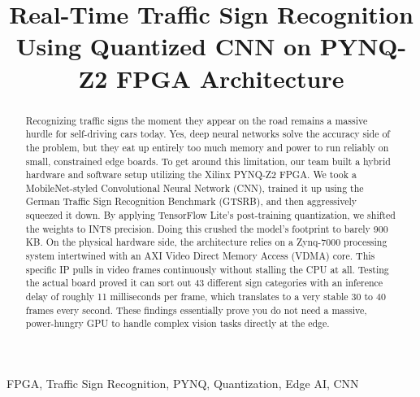 \documentclass[conference]{IEEEtran}
\begin{document}
\title{Real-Time Traffic Sign Recognition Using Quantized CNN on PYNQ-Z2 FPGA Architecture}

\author{
\and
{}
}

\maketitle

\begin{abstract}
Recognizing traffic signs the moment they appear on the road remains a massive hurdle for self-driving cars today. Yes, deep neural networks solve the accuracy side of the problem, but they eat up entirely too much memory and power to run reliably on small, constrained edge boards. To get around this limitation, our team built a hybrid hardware and software setup utilizing the Xilinx PYNQ-Z2 FPGA. We took a MobileNet-styled Convolutional Neural Network (CNN), trained it up using the German Traffic Sign Recognition Benchmark (GTSRB), and then aggressively squeezed it down. By applying TensorFlow Lite's post-training quantization, we shifted the weights to INT8 precision. Doing this crushed the model's footprint to barely 900 KB. On the physical hardware side, the architecture relies on a Zynq-7000 processing system intertwined with an AXI Video Direct Memory Access (VDMA) core. This specific IP pulls in video frames continuously without stalling the CPU at all. Testing the actual board proved it can sort out 43 different sign categories with an inference delay of roughly 11 milliseconds per frame, which translates to a very stable 30 to 40 frames every second. These findings essentially prove you do not need a massive, power-hungry GPU to handle complex vision tasks directly at the edge.
\end{abstract}

\begin{IEEEkeywords}
FPGA, Traffic Sign Recognition, PYNQ, Quantization, Edge AI, CNN
\end{IEEEkeywords}
\end{document}
